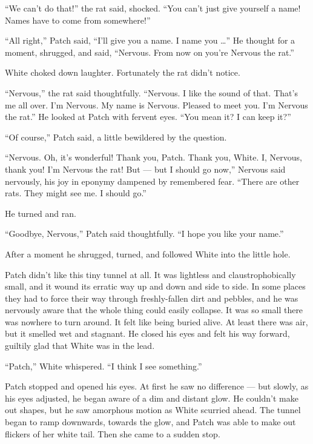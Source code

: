 \documentclass[ebook,oneside,openany,17pt]{memoir}
\newenvironment{tolerant}[1]{%
  \par\tolerance=#1\relax
}{%
  \par
}
\begin{document}
“We can’t do that!” the rat said, shocked. “You can’t just give
yourself a name! Names have to come from somewhere!”

“All right,” Patch said, “I’ll give you a name. I name you …” He
thought for a moment, shrugged, and said, “Nervous. From now on you’re
Nervous the rat.”

White choked down laughter. Fortunately the rat didn’t notice.

“Nervous,” the rat said thoughtfully. “Nervous. I like the sound of
that. That’s me all over. I’m Nervous. My name is Nervous. Pleased to
meet you. I’m Nervous the rat.” He looked at Patch with fervent
eyes. “You mean it? I can keep it?”

“Of course,” Patch said, a little bewildered by the question.

“Nervous. Oh, it’s wonderful! Thank you, Patch. Thank you, White. I,
Nervous, thank you! I’m Nervous the rat! But — but I should go now,”
Nervous said nervously, his joy in eponymy dampened by remembered
fear. “There are other rats. They might see me. I should go.”

He turned and ran.

“Goodbye, Nervous,” Patch said thoughtfully. “I hope you like your
name.”

After a moment he shrugged, turned, and followed White into the little
hole.

Patch didn’t like this tiny tunnel at all. It was lightless and
claustrophobically small, and it wound its erratic way up and down and
side to side. In some places they had to force their way through
freshly-fallen dirt and pebbles, and he was nervously aware that the
whole thing could easily collapse. It was so small there was nowhere
to turn around. It felt like being buried alive. At least there was
air, but it smelled wet and stagnant. He closed his eyes and felt his
way forward, guiltily glad that White was in the lead.

“Patch,” White whispered. “I think I see something.”

\begin{tolerant}{1000}
Patch stopped and opened his eyes. At first he saw no difference — but
slowly, as his eyes adjusted, he began aware of a dim and distant
glow. He couldn’t make out shapes, but he saw amorphous motion as
White scurried ahead. The tunnel began to ramp downwards, towards the
glow, and Patch was able to make out flickers of her white tail. Then
she came to a sudden stop.
\end{tolerant}
\end{document}
